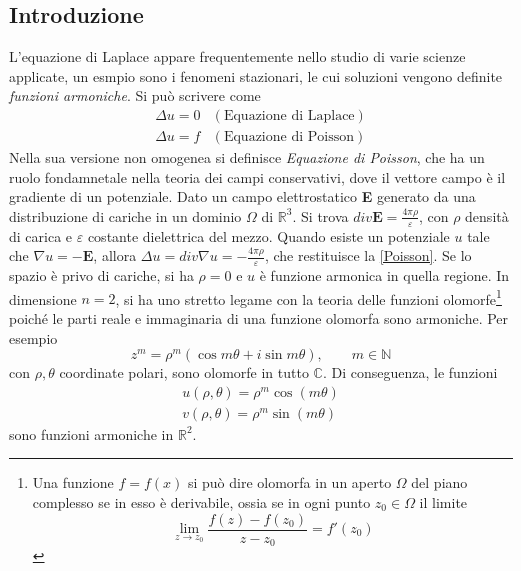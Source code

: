\documentclass[a4paper,12pt, draft]{article}
\theoremstyle{break}
\let\epsilon\varepsilon
\numberwithin{equation}{section}
\begin{document}
\subsection{Introduzione}
L'equazione di Laplace appare frequentemente nello studio di varie scienze applicate, un esmpio sono i fenomeni stazionari, le cui soluzioni vengono definite \emph{funzioni armoniche}. Si può scrivere come 
\begin{eqnarray}
  \Delta u = 0  & (\mbox{Equazione di Laplace}) \label{Laplace} \\
  \Delta u = f & (\mbox{Equazione di Poisson}) \label{Poisson}
\end{eqnarray}
Nella sua versione non omogenea si definisce \emph{Equazione di Poisson}, che ha un ruolo fondamnetale nella teoria dei campi conservativi, dove il vettore campo è il gradiente di un potenziale.
Dato un campo elettrostatico \textbf{E} generato da una distribuzione di cariche in un dominio \(\Omega\) di \(\mathbb{R}^3\). Si trova \(div\bm{E} = \frac{4 \pi \rho}{\epsilon}\), con \(\rho\) densità di carica e \(\epsilon\) costante dielettrica del mezzo. Quando esiste un potenziale \(u\) tale che \(\nabla u = -\bm{E}\), allora \(\Delta u = div \nabla u = -\frac{4 \pi \rho}{\epsilon}\), che restituisce la \eqref{Poisson}. Se lo spazio è privo di cariche, si ha \(\rho = 0\) e \(u\) è funzione armonica in quella regione.
In dimensione \(n = 2\), si ha uno stretto legame con la teoria delle funzioni olomorfe\footnote{Una funzione \(f = f(x)\) si può dire olomorfa in un aperto \(\Omega\) del piano complesso se in esso è derivabile, ossia se in ogni punto \(z_0 \in \Omega\) il limite 
\[
  \lim_{z \to z_0} \frac{f(z)-f(z_0)}{z-z_0} = f'(z_0)
\]}
poiché le parti reale e immaginaria di una funzione olomorfa sono armoniche. Per esempio
\[
  z^m = \rho^m(\cos{m\theta} + i \sin{m\theta}), \qquad m \in \mathbb{N}
\]
con \(\rho, \theta\) coordinate polari, sono olomorfe in tutto \(\mathbb{C}\). Di conseguenza, le funzioni
\[
\begin{array}{c}
  u(\rho, \theta) = \rho^m \cos(m\theta) \\
  v(\rho, \theta) = \rho^m \sin(m\theta)
\end{array}  
\]
sono funzioni armoniche in \(\mathbb{R}^2\).
\end{document}
